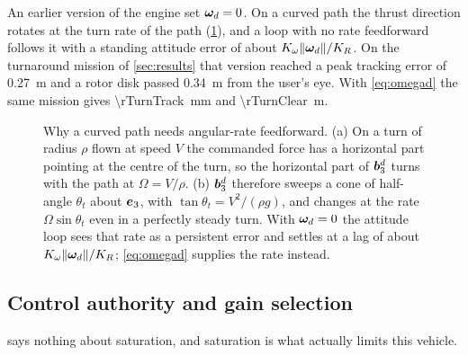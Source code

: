 \begin{remark}
An earlier version of the engine set $\bm{\omega}_d=0$. On a curved path the
thrust direction rotates at the turn rate of the path (\cref{fig:thrustrot}),
and a loop with no rate
feedforward follows it with a standing attitude error of about
$K_\omega\|\bm{\omega}_d\|/K_R$. On the turnaround mission of
\cref{sec:results} that version reached a peak tracking error of
\SI{0.27}{\metre} and a rotor disk passed \SI{0.34}{\metre} from the user's
eye. With \cref{eq:omegad} the same mission gives \SI{\rTurnTrack}{\milli\metre}
and \SI{\rTurnClear}{\metre}.
\end{remark}

\begin{figure}[tbp]
\centering

\caption{Why a curved path needs angular-rate feedforward. (a) On a turn of
radius $\rho$ flown at speed $V$ the commanded force has a horizontal part
pointing at the centre of the turn, so the horizontal part of $\bm{b}_3^d$
turns with the path at $\Omega=V/\rho$. (b) $\bm{b}_3^d$ therefore sweeps a cone
of half-angle $\theta_t$ about $\bm{e}_3$, with $\tan\theta_t=V^2/(\rho g)$, and changes
at the rate $\Omega\sin\theta_t$ even in a perfectly steady turn. With
$\bm{\omega}_d=0$ the attitude loop sees that rate as a persistent error and
settles at a lag of about $K_\omega\|\bm{\omega}_d\|/K_R$; \cref{eq:omegad}
supplies the rate instead.}
\label{fig:thrustrot}
\end{figure}

\subsection{Control authority and gain selection}

 says nothing about saturation, and saturation is what actually
limits this vehicle.


